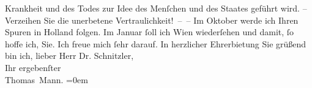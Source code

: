 \begin{ledgroupsized}[t]{13cm}
               Krankheit und des Todes zur Idee des Menſchen und des Staates geführt wird. –
               Verzeihen Sie die unerbetene Vertraulichkeit! – –\pend
           \pstart
           Im Oktober werde ich Ihren Spuren in Holland folgen. Im Januar{ }ſoll ich Wien
               wiederſehen und damit, ſo hoffe ich, Sie. Ich freue mich ſehr darauf.\pend
           \pstart
           In herzlicher Ehrerbietung Sie grüßend bin ich, lieber Herr Dr.
               Schnitzler,{\\[\baselineskip]}Ihr ergebenſter{\\[\baselineskip]}\spacefill\mbox{Thomas Mann.}\pend
           \leftskip=0em{}
         
         \endnumbering{}\end{ledgroupsized}  \newcommand{\dateiname}{L02392}\newcommand{\titel}{Thomas Mann an Arthur Schnitzler, 4. 9. 1922}\newcommand{\editorInnen}{Martin Anton Müller und Gerd-Hermann Susen}
      